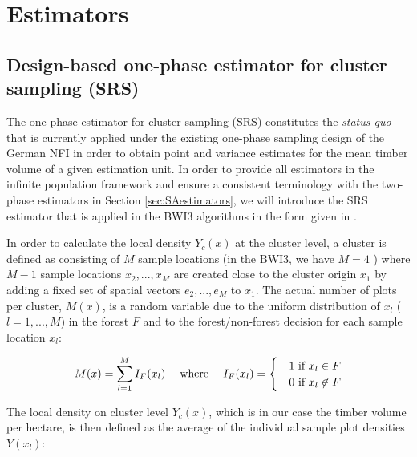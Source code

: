 \documentclass[remotesensing,article,submit,moreauthors,pdftex,10pt,a4paper]{mdpi}
\begin{document}
\section{Estimators}
\label{sec:estimators}


\subsection{Design-based one-phase estimator for cluster sampling (SRS)}
\label{sec:srs_estimator}

The one-phase estimator for cluster sampling (SRS) constitutes the \textit{status quo} that is currently applied under the existing one-phase sampling design of the German NFI in order to obtain point and variance estimates for the mean timber volume of a given estimation unit. In order to provide all estimators in the infinite population framework and ensure a consistent terminology with the two-phase estimators in Section \ref{sec:SAestimators}, we will introduce the SRS estimator that is applied in the BWI3 algorithms \citep{bwi3_ausw} in the form given in \citet{mandallaz2008, mandallaz2016}.\par 
In order to calculate the local density $Y_{c}(x)$ at the cluster level, a cluster is defined as consisting of $M$ sample locations (in the BWI3, we have $M=4$ ) where $M-1$ sample locations $x_2, ..., x_M$ are created close to the cluster origin $x_1$ by adding a fixed set of spatial vectors $e_2, ..., e_M$ to $x_1$. The actual number of plots per cluster, $M(x)$, is a random variable due to the uniform distribution of $x_l$ ($l=1, ..., M$) in the forest $F$ and to the forest/non-forest decision for each sample location $x_l$:

\begin{equation}\label{eq:Mx}
M(x)=\sum_{l=1}^{M}I_{F}(x_l) \hspace{3ex} \text{where} \hspace{3ex} I_F(x_l)=\begin{cases}&1 \text{ if $x_l \in F$}\\
&0 \text{ if $x_l\not\in F$}
\end{cases}
\end{equation}

The local density on cluster level $Y_{c}(x)$, which is in our case the timber volume per hectare, is then defined as the average of the individual sample plot densities $Y(x_l)$:
\end{document}
